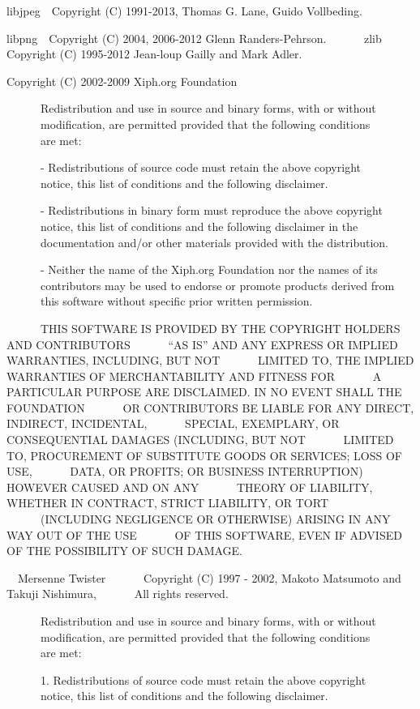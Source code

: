 libjpeg　Copyright (C) 1991-2013, Thomas G. Lane, Guido Vollbeding.

libpng　Copyright (C) 2004, 2006-2012 Glenn Randers-Pehrson.
　　　zlib　Copyright (C) 1995-2012 Jean-loup Gailly and Mark Adler.
　

Copyright (C) 2002-2009 Xiph.org Foundation

　　　Redistribution and use in source and binary forms, with or without
　　　modification, are permitted provided that the following conditions
　　　are met:

　　　- Redistributions of source code must retain the above copyright
　　　notice, this list of conditions and the following disclaimer.

　　　- Redistributions in binary form must reproduce the above copyright
　　　notice, this list of conditions and the following disclaimer in the
　　　documentation and/or other materials provided with the distribution.

　　　- Neither the name of the Xiph.org Foundation nor the names of its
　　　contributors may be used to endorse or promote products derived from
　　　this software without specific prior written permission.

　　　THIS SOFTWARE IS PROVIDED BY THE COPYRIGHT HOLDERS AND CONTRIBUTORS
　　　``AS IS'' AND ANY EXPRESS OR IMPLIED WARRANTIES, INCLUDING, BUT NOT
　　　LIMITED TO, THE IMPLIED WARRANTIES OF MERCHANTABILITY AND FITNESS FOR
　　　A PARTICULAR PURPOSE ARE DISCLAIMED. IN NO EVENT SHALL THE FOUNDATION
　　　OR CONTRIBUTORS BE LIABLE FOR ANY DIRECT, INDIRECT, INCIDENTAL,
　　　SPECIAL, EXEMPLARY, OR CONSEQUENTIAL DAMAGES (INCLUDING, BUT NOT
　　　LIMITED TO, PROCUREMENT OF SUBSTITUTE GOODS OR SERVICES; LOSS OF USE,
　　　DATA, OR PROFITS; OR BUSINESS INTERRUPTION) HOWEVER CAUSED AND ON ANY
　　　THEORY OF LIABILITY, WHETHER IN CONTRACT, STRICT LIABILITY, OR TORT
　　　(INCLUDING NEGLIGENCE OR OTHERWISE) ARISING IN ANY WAY OUT OF THE USE
　　　OF THIS SOFTWARE, EVEN IF ADVISED OF THE POSSIBILITY OF SUCH DAMAGE.


　Mersenne Twister
　　　Copyright (C) 1997 - 2002, Makoto Matsumoto and Takuji Nishimura,
　　　All rights reserved.

　　　Redistribution and use in source and binary forms, with or without
　　　modification, are permitted provided that the following conditions
　　　are met:

　　　1. Redistributions of source code must retain the above copyright
　　　notice, this list of conditions and the following disclaimer.

